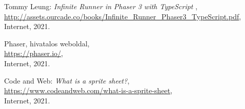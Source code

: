 \begin{thebibliography}{x}
	Tommy Leung: \emph{Infinite Runner in Phaser 3 with	TypeScript
}, \\
	\url{http://assets.ourcade.co/books/Infinite_Runner_Phaser3_TypeScript.pdf},
	Internet, 2021.
	
	Phaser, hivatalos weboldal, \\
	\url{https://phaser.io/}, \\
	Internet, 2021.
	
	Code and Web: \emph{What is a sprite sheet?}, \\
	\url{https://www.codeandweb.com/what-is-a-sprite-sheet}, \\
	Internet, 2021.

\end{thebibliography}

